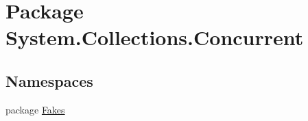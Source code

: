 \hypertarget{namespace_system_1_1_collections_1_1_concurrent}{\section{Package System.\-Collections.\-Concurrent}
\label{namespace_system_1_1_collections_1_1_concurrent}
}
\subsection*{Namespaces}
\begin{DoxyCompactItemize}
\item 
package \hyperlink{namespace_system_1_1_collections_1_1_concurrent_1_1_fakes}{Fakes}
\end{DoxyCompactItemize}
